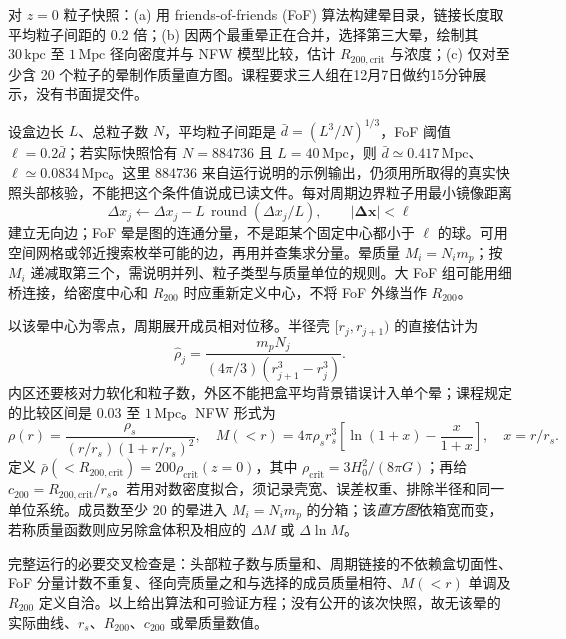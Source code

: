 \begin{exercise}
对 $z=0$ 粒子快照：(a) 用 friends-of-friends (FoF) 算法构建晕目录，链接长度取平均粒子间距的 $0.2$ 倍；(b) 因两个最重晕正在合并，选择第三大晕，绘制其 $30\,\mathrm{kpc}$ 至 $1\,\mathrm{Mpc}$ 径向密度并与 NFW 模型比较，估计 $R_{200,\mathrm{crit}}$ 与浓度；(c) 仅对至少含 20 个粒子的晕制作质量直方图。课程要求三人组在12月7日做约15分钟展示，没有书面提交件。
\end{exercise}
\begin{solution}
设盒边长 $L$、总粒子数 $N$，平均粒子间距是 $\bar d=(L^3/N)^{1/3}$，FoF 阈值 $\ell=0.2\bar d$；若实际快照恰有 $N=884736$ 且 $L=40\,\mathrm{Mpc}$，则 $\bar d\simeq0.417\,\mathrm{Mpc}$、$\ell\simeq0.0834\,\mathrm{Mpc}$。这里 $884736$ 来自运行说明的示例输出，仍须用所取得的真实快照头部核验，不能把这个条件值说成已读文件。每对周期边界粒子用最小镜像距离
\[
 \Delta x_j\leftarrow\Delta x_j-L\,\operatorname{round}(\Delta x_j/L),\qquad
 |\boldsymbol{\Delta x}|<\ell
\]
建立无向边；FoF 晕是图的连通分量，不是距某个固定中心都小于 $\ell$ 的球。可用空间网格或邻近搜索枚举可能的边，再用并查集求分量。晕质量 $M_i=N_i m_p$；按 $M_i$ 递减取第三个，需说明并列、粒子类型与质量单位的规则。大 FoF 组可能用细桥连接，给密度中心和 $R_{200}$ 时应重新定义中心，不将 FoF 外缘当作 $R_{200}$。

以该晕中心为零点，周期展开成员相对位移。半径壳 $[r_j,r_{j+1})$ 的直接估计为
\[
 \hat\rho_j=\frac{m_pN_j}{(4\pi/3)(r_{j+1}^3-r_j^3)} .
\]
内区还要核对力软化和粒子数，外区不能把盒平均背景错误计入单个晕；课程规定的比较区间是 $0.03$ 至 $1\,\mathrm{Mpc}$。NFW 形式为
\[
 \rho(r)=\frac{\rho_s}{(r/r_s)(1+r/r_s)^2},\quad
 M(<r)=4\pi\rho_s r_s^3\left[\ln(1+x)-\frac{x}{1+x}\right],\quad x=r/r_s .
\]
定义 $\bar\rho(<R_{200,\mathrm{crit}})=200\rho_{\mathrm{crit}}(z=0)$，其中 $\rho_{\mathrm{crit}}=3H_0^2/(8\pi G)$；再给 $c_{200}=R_{200,\mathrm{crit}}/r_s$。若用对数密度拟合，须记录壳宽、误差权重、排除半径和同一单位系统。成员数至少 20 的晕进入 $M_i=N_im_p$ 的分箱；该\emph{直方图}依箱宽而变，若称质量函数则应另除盒体积及相应的 $\Delta M$ 或 $\Delta\ln M$。

完整运行的必要交叉检查是：头部粒子数与质量和、周期链接的不依赖盒切面性、FoF 分量计数不重复、径向壳质量之和与选择的成员质量相符、$M(<r)$ 单调及 $R_{200}$ 定义自洽。以上给出算法和可验证方程；没有公开的该次快照，故无该晕的实际曲线、$r_s$、$R_{200}$、$c_{200}$ 或晕质量数值。
\end{solution}
